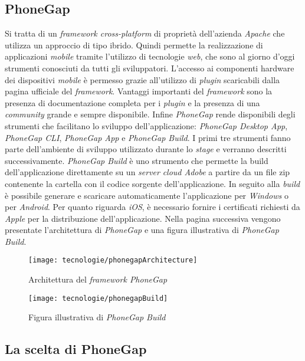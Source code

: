 \subsection{PhoneGap}

Si tratta di un \textit{framework cross-platform} di proprietà dell'azienda \textit{Apache} che utilizza un approccio di tipo ibrido. Quindi permette la realizzazione di applicazioni \textit{mobile} tramite l'utilizzo di tecnologie \textit{web}, che sono al giorno d'oggi strumenti conosciuti da tutti gli sviluppatori. L'accesso ai componenti hardware dei dispositivi \textit{mobile} è permesso grazie all'utilizzo di \textit{plugin} scaricabili dalla pagina ufficiale del \textit{framework}. Vantaggi importanti del \textit{framework} sono la presenza di documentazione completa per i \textit{plugin} e la presenza di una \textit{community} grande e sempre disponibile. Infine \textit{PhoneGap} rende disponibili degli strumenti che facilitano lo sviluppo dell'applicazione: \textit{PhoneGap Desktop App}, \textit{PhoneGap CLI}, \textit{PhoneGap App} e \textit{PhoneGap Build}. I primi tre strumenti fanno parte dell'ambiente di sviluppo utilizzato durante lo \textit{stage} e verranno descritti successivamente. \textit{PhoneGap Build} è uno strumento che permette la build dell'applicazione direttamente su un \textit{server} \textit{cloud Adobe} a partire da un file zip contenente la cartella con il codice sorgente dell'applicazione. In seguito alla \textit{build} è possibile generare e scaricare automaticamente l'applicazione per \textit{Windows} o per \textit{Android}. Per quanto riguarda \textit{iOS}, è necessario fornire i certificati richiesti da \textit{Apple} per la distribuzione dell'applicazione. Nella pagina successiva vengono presentate l'architettura di \textit{PhoneGap} e una figura illustrativa di \textit{PhoneGap Build}.

\begin{figure}[!h] 
    \centering 
    \texttt{[image: tecnologie/phonegapArchitecture]} 
    \caption{Architettura del \textit{framework PhoneGap}}
\end{figure}

\begin{figure}[!h] 
    \centering 
    \texttt{[image: tecnologie/phonegapBuild]} 
    \caption{Figura illustrativa di \textit{PhoneGap Build}}
\end{figure}

\newpage


\subsection{La scelta di PhoneGap}

